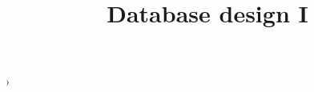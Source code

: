 \documentclass[a4paper]{article}
\title{Database design I}
\begin{document}
    \maketitle
    \tableofcontents
    \newpage
    
    
    
    ›
    
\end{document}
